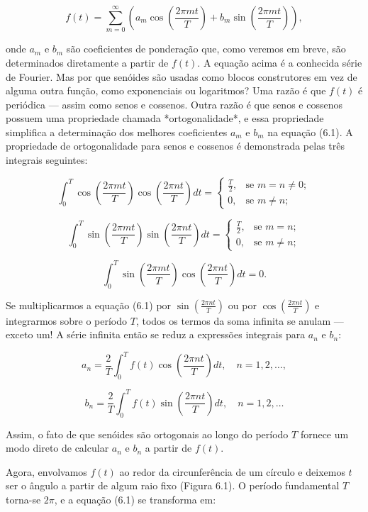 $$
f(t) = \sum_{m=0}^{\infty} \left( a_m \cos\left(\frac{2\pi m t}{T} \right) + b_m \sin\left(\frac{2\pi m t}{T} \right) \right),
$$

onde $a_m$ e $b_m$ são coeficientes de ponderação que, como veremos em breve, são determinados diretamente a partir de $f(t)$. A equação acima é a conhecida série de Fourier. Mas por que senóides são usadas como blocos construtores em vez de alguma outra função, como exponenciais ou logaritmos?
Uma razão é que $f(t)$ é periódica — assim como senos e cossenos. Outra razão é que senos e cossenos possuem uma propriedade chamada *ortogonalidade*, e essa propriedade simplifica a determinação dos melhores coeficientes $a_m$ e $b_m$ na equação (6.1).
A propriedade de ortogonalidade para senos e cossenos é demonstrada pelas três integrais seguintes:

$$
\int_0^T \cos\left(\frac{2\pi m t}{T}\right) \cos\left(\frac{2\pi n t}{T}\right) dt =
\begin{cases}
\frac{T}{2}, & \text{se } m = n \ne 0; \\
0, & \text{se } m \ne n;
\end{cases}
$$

$$
\int_0^T \sin\left(\frac{2\pi m t}{T}\right) \sin\left(\frac{2\pi n t}{T}\right) dt =
\begin{cases}
\frac{T}{2}, & \text{se } m = n; \\
0, & \text{se } m \ne n;
\end{cases}
$$

$$
\int_0^T \sin\left(\frac{2\pi m t}{T}\right) \cos\left(\frac{2\pi n t}{T}\right) dt = 0.
$$

Se multiplicarmos a equação (6.1) por $\sin\left(\frac{2\pi n t}{T}\right)$ ou por $\cos\left(\frac{2\pi n t}{T}\right)$ e integrarmos sobre o período $T$, todos os termos da soma infinita se anulam — exceto um!
A série infinita então se reduz a expressões integrais para $a_n$ e $b_n$:

$$
a_n = \frac{2}{T} \int_0^T f(t) \cos\left(\frac{2\pi n t}{T}\right) dt, \quad n = 1, 2, \dots,
$$

$$
b_n = \frac{2}{T} \int_0^T f(t) \sin\left(\frac{2\pi n t}{T}\right) dt, \quad n = 1, 2, \dots
$$

Assim, o fato de que senóides são ortogonais ao longo do período $T$ fornece um modo direto de calcular $a_n$ e $b_n$ a partir de $f(t)$.

Agora, envolvamos $f(t)$ ao redor da circunferência de um círculo e deixemos $t$ ser o ângulo a partir de algum raio fixo (Figura 6.1). O período fundamental $T$ torna-se $2\pi$, e a equação (6.1) se transforma em:

